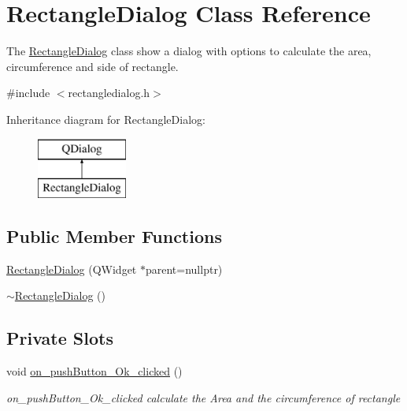 \hypertarget{class_rectangle_dialog}{}\section{Rectangle\+Dialog Class Reference}
\label{class_rectangle_dialog}


The \mbox{\hyperlink{class_rectangle_dialog}{Rectangle\+Dialog}} class show a dialog with options to calculate the area, circumference and side of rectangle.  




{\ttfamily \#include $<$rectangledialog.\+h$>$}

Inheritance diagram for Rectangle\+Dialog\+:\begin{figure}[H]
\begin{center}
\leavevmode
\includegraphics[height=2.000000cm]{class_rectangle_dialog}
\end{center}
\end{figure}
\subsection*{Public Member Functions}
\begin{DoxyCompactItemize}
\item 
\mbox{\hyperlink{class_rectangle_dialog_abe1855a7bfdf24450033fe3c17837db6}{Rectangle\+Dialog}} (Q\+Widget $\ast$parent=nullptr)
\item 
\mbox{\hyperlink{class_rectangle_dialog_a356cf182f6d805c50d5b3c4e97cbae81}{$\sim$\+Rectangle\+Dialog}} ()
\end{DoxyCompactItemize}
\subsection*{Private Slots}
\begin{DoxyCompactItemize}
\item 
void \mbox{\hyperlink{class_rectangle_dialog_a1f4ec776eedd80298bbe6c6f408027c9}{on\+\_\+push\+Button\+\_\+\+Ok\+\_\+clicked}} ()
\begin{DoxyCompactList}\small\item\em on\+\_\+push\+Button\+\_\+\+Ok\+\_\+clicked calculate the Area and the circumference of rectangle \end{DoxyCompactList}\end{DoxyCompactItemize}
